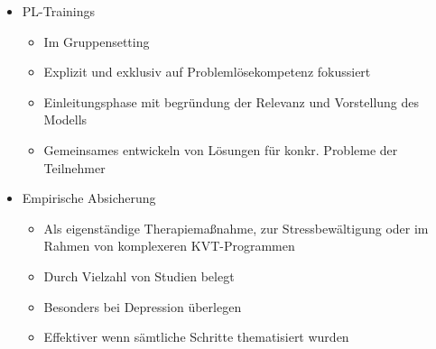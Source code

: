 \documentclass[11pt, paper=a4, twocolumn]{scrartcl}
\begin{document}
\begin{itemize}
\begin{itemize}
				\end{itemize}
			\item PL-Trainings
				\begin{itemize}
					\item Im Gruppensetting 
					\item Explizit und exklusiv auf Problemlösekompetenz fokussiert
					\item Einleitungsphase mit begründung der Relevanz und Vorstellung des Modells
					\item Gemeinsames entwickeln von Lösungen für konkr. Probleme der Teilnehmer
				\end{itemize}
			\item Empirische Absicherung
				\begin{itemize}
					\item Als eigenständige Therapiemaßnahme, zur Stressbewältigung oder im Rahmen von komplexeren KVT-Programmen
					\item Durch Vielzahl von Studien belegt
					\item Besonders bei Depression überlegen
					\item Effektiver wenn sämtliche Schritte thematisiert wurden
				\end{itemize}
		\end{itemize}
\end{document}
